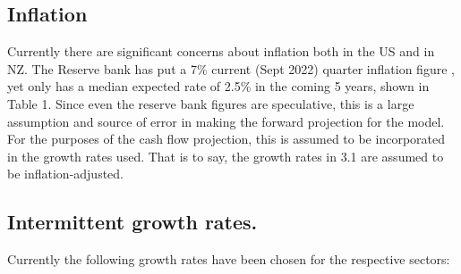 \documentclass{article}
\begin{document}
\subsection{Inflation}
\begin{table}[h]
\centering
\caption{Reserve Bank of NZ Inflation figures}
\label{tab:rbnz_inflation}
\end{table}

Currently there are significant concerns about inflation both in the US and in NZ. The Reserve bank has put a 7\% current (Sept 2022) quarter inflation figure \cite{nzinflation}, yet only has a median expected rate of 2.5\% in the coming 5 years, shown in Table 1. Since even the reserve bank figures are speculative, this is a large assumption and source of error in making the forward projection for the model. For the purposes of the cash flow projection, this is assumed to be incorporated in the growth rates used. That is to say, the growth rates in 3.1 are assumed to be inflation-adjusted.

\newpage
\subsection{Intermittent growth rates.}
Currently the following growth rates have been chosen for the respective sectors:

\begin{table}[h]
\centering
\caption{Annual inflation inclusive growth rates used for FCF projection.}
\label{tab:currencies}
\end{table}
\end{document}
